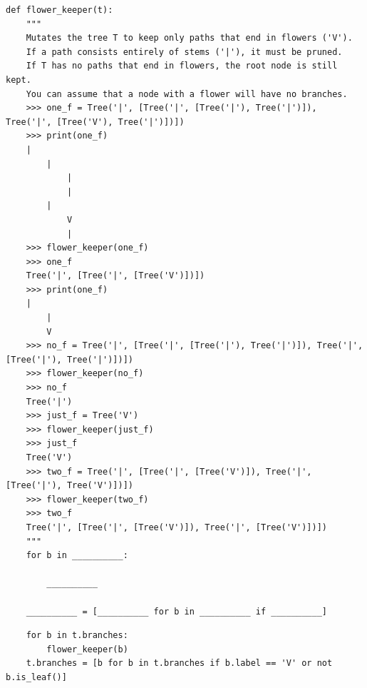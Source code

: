 \begin{lstlisting}
def flower_keeper(t):
    """
    Mutates the tree T to keep only paths that end in flowers ('V').
    If a path consists entirely of stems ('|'), it must be pruned.
    If T has no paths that end in flowers, the root node is still kept.
    You can assume that a node with a flower will have no branches.
    >>> one_f = Tree('|', [Tree('|', [Tree('|'), Tree('|')]), Tree('|', [Tree('V'), Tree('|')])])
    >>> print(one_f)
    |
        |
            |
            |
        |
            V
            |
    >>> flower_keeper(one_f)
    >>> one_f
    Tree('|', [Tree('|', [Tree('V')])])
    >>> print(one_f)
    |
        |
        V
    >>> no_f = Tree('|', [Tree('|', [Tree('|'), Tree('|')]), Tree('|', [Tree('|'), Tree('|')])])
    >>> flower_keeper(no_f)
    >>> no_f
    Tree('|')
    >>> just_f = Tree('V')
    >>> flower_keeper(just_f)
    >>> just_f
    Tree('V')
    >>> two_f = Tree('|', [Tree('|', [Tree('V')]), Tree('|', [Tree('|'), Tree('V')])])
    >>> flower_keeper(two_f)
    >>> two_f
    Tree('|', [Tree('|', [Tree('V')]), Tree('|', [Tree('V')])])
    """
    for b in __________:

        __________

    __________ = [__________ for b in __________ if __________]
\end{lstlisting}
\begin{solution}[0.5in]
\begin{lstlisting}
    for b in t.branches:
        flower_keeper(b)
    t.branches = [b for b in t.branches if b.label == 'V' or not b.is_leaf()]
\end{lstlisting}
\end{solution}
